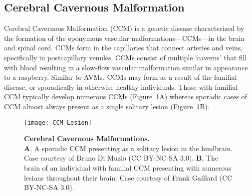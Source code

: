 \subsection{Cerebral Cavernous Malformation}
Cerebral Cavernous Malformation (CCM) is a genetic disease characterized by the formation of the eponymous vascular malformations---CCMs---in the brain and spinal cord. CCMs form in the capillaries that connect arteries and veins, specifically in postcapillary venules. CCMs consist of multiple `caverns' that fill with blood resulting in a slow-flow vascular malformation similar in appearance to a raspberry. Similar to AVMs, CCMs may form as a result of the familial disease, or sporadically in otherwise healthy individuals. Those with familial CCM typically develop numerous CCMs (Figure~\ref{CCM_Lesion}A) whereas sporadic cases of CCM almost always present as a single solitary lesion (Figure~\ref{CCM_Lesion}B). 

\begin{figure}[tbp!]
\begin{center}
\texttt{[image: CCM\_Lesion]}
\end{center}
\caption[Cerebral Cavernous Malformations] {\textbf{Cerebral Cavernous Malformations.} \\ \textbf{A},  A sporadic CCM presenting as a solitary lesion in the hindbrain. Case courtesy of Bruno Di Muzio (CC BY-NC-SA 3.0). \textbf{B}, The brain of an individual with familial CCM presenting with numerous lesions throughout their brain. Case courtesy of Frank Gaillard (CC BY-NC-SA 3.0).}


\label{CCM_Lesion}
\end{figure}

